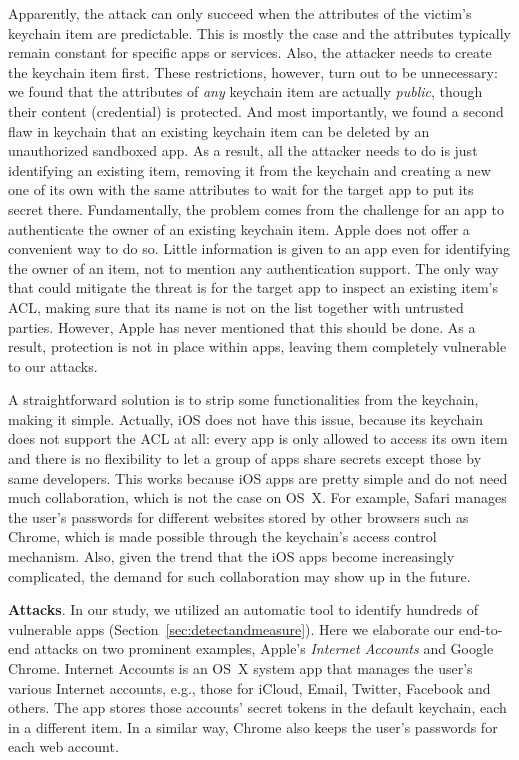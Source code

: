 \documentclass{article}
\newcommand{\ignore}[1]{}
\begin{document}
Apparently, the attack can only succeed when the attributes of the victim's keychain item are predictable. This is mostly the case and the attributes typically remain constant for specific apps or services\ignore{, except the \texttt{account name} part which depends on the specific victim (usually the user's email address)}.  Also, the attacker needs to create the keychain item first. These restrictions, however, turn out to be unnecessary: we found that the attributes of \textit{any} keychain item are actually \textit{public}, though their content (credential) is protected. And most importantly, we found a second flaw in keychain that an existing keychain item can be deleted by an unauthorized sandboxed app.  As a result, all the attacker needs to do is just identifying an existing item, removing it from the keychain and creating a new one of its own with the same attributes to wait for the target app to put its secret there. Fundamentally, the problem comes from the challenge for an app to authenticate the owner of an existing keychain item. Apple does not offer a convenient way to do so.  Little information is given to an app even for identifying the owner of an item, not to mention any authentication support.  The only way that could mitigate the threat is for the target app to inspect an existing item's ACL, making sure that its name is not on the list together with untrusted parties. However, Apple has never mentioned that this should be done. As a result, protection is not in place within apps, leaving them completely vulnerable to our attacks.





A straightforward solution is to strip some functionalities from the keychain, making it simple. Actually, iOS does not have this issue, because its keychain does not support the ACL at all: every app is only allowed to access its own item and there is no flexibility to let a group of apps share secrets except those by same developers. This works because iOS apps are pretty simple and do not need much collaboration, which is not the case on OS~X.  For example, Safari manages the user's passwords for different websites stored by other browsers such as Chrome, which is made possible through the keychain's access control mechanism. Also, given the trend that the iOS apps become increasingly complicated, the demand for such collaboration may show up in the future.

\vspace {3pt}\noindent\textbf{Attacks}. In our study, we utilized an automatic tool to identify hundreds of vulnerable apps (Section~\ref{sec:detectandmeasure}). Here we elaborate our end-to-end attacks on two prominent examples, Apple's \textit{Internet Accounts} and Google Chrome. Internet Accounts is an OS~X system app that manages the user's various Internet accounts, e.g., those for iCloud, Email, Twitter, Facebook and others.  The app stores those accounts' secret tokens in the default keychain, each in a different item. In a similar way, Chrome also keeps the user's passwords for each web account.
\end{document}
